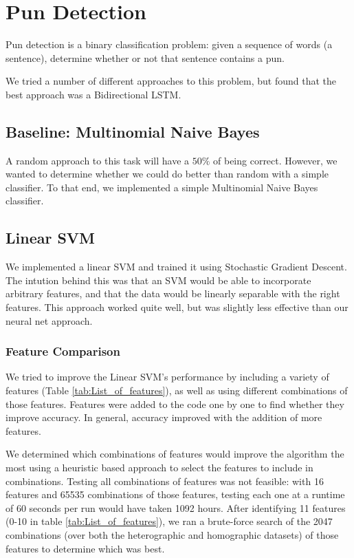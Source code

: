 \documentclass{article}
\begin{document}

\section{Pun Detection}\label{pun_detection}

Pun detection is a binary classification problem: given a sequence of words (a
sentence), determine whether or not that sentence contains a pun. 

We tried a number of different approaches to this problem, but found that the
best approach was a Bidirectional LSTM.

\subsection{Baseline: Multinomial Naive Bayes}

A random approach to this task will have a $50\%$ of being correct.
However, we wanted to determine whether we could do better than random with a
simple classifier. To that end, we implemented a simple Multinomial Naive Bayes
classifier. 

\subsection{Linear SVM}

We implemented a linear SVM and trained it using Stochastic Gradient Descent.
The intution behind this was that an SVM would be able to incorporate arbitrary
features, and that the data would be linearly separable with the right features.
This approach worked quite well, but was slightly less effective than our neural
net approach.

\subsubsection{Feature Comparison}

We tried to improve the Linear SVM's performance by including a variety of
features (Table \ref{tab:List_of_features}), as well as using different
combinations of those features.  Features were added to the code one by one to
find whether they improve accuracy. In general, accuracy improved with the
addition of more features.

We determined which combinations of features would improve the algorithm the
most using a heuristic based approach to select the features to include in
combinations. Testing all combinations of features was not feasible: with 16
features and 65535 combinations of those features, testing each one at a runtime
of 60 seconds per run would have taken 1092 hours. After identifying 11
features (0-10 in table \ref{tab:List_of_features}), we ran a brute-force search
of the 2047 combinations (over both the heterographic and homographic datasets)
of those features to determine which was best.
\end{document}
